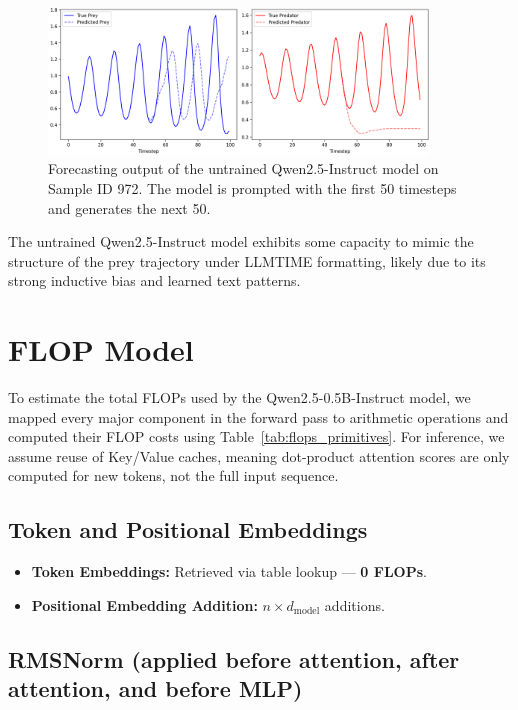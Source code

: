 \documentclass[a4paper,12pt]{article}
\begin{document}
  \begin{figure}[h]
      \centering
      \includegraphics[width=0.9\textwidth]{sample972_untrained.png}
      \caption{Forecasting output of the untrained Qwen2.5-Instruct model on Sample ID 972. The model is prompted with the first 50 timesteps and generates the next 50.}
      \label{fig:sample972_untrained}
  \end{figure}
  
  The untrained Qwen2.5-Instruct model exhibits some capacity to mimic the structure of the prey trajectory under LLMTIME formatting, likely due to its strong inductive bias and learned text patterns.
  
  \section{FLOP Model}

To estimate the total FLOPs used by the Qwen2.5-0.5B-Instruct model, we mapped every major component in the forward pass to arithmetic operations and computed their FLOP costs using Table~\ref{tab:flops_primitives}. For inference, we assume reuse of Key/Value caches, meaning dot-product attention scores are only computed for new tokens, not the full input sequence.

\subsection*{Token and Positional Embeddings}
\begin{itemize}
  \item \textbf{Token Embeddings:} Retrieved via table lookup — \textbf{0 FLOPs}.
  \item \textbf{Positional Embedding Addition:} $n \times d_{\text{model}}$ additions.
\end{itemize}

\subsection*{RMSNorm (applied before attention, after attention, and before MLP)}
\end{document}
